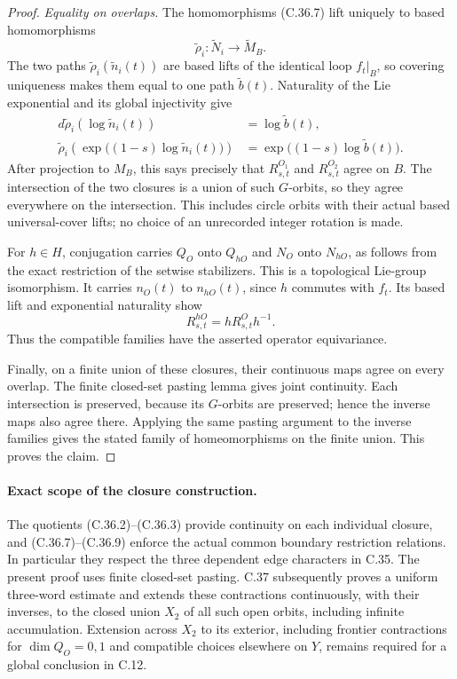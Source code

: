 \begin{proof}
\emph{Equality on overlaps.}
The homomorphisms (C.36.7) lift
uniquely to based homomorphisms
\[
               \widetilde\rho_i:
                    \widetilde N_i\longrightarrow
                    \widetilde M_B.
                                                        \tag{C.36.8}
\]
The two paths
$\widetilde\rho_i(\widetilde n_i(t))$
are based lifts of the identical
loop $f_t|_B$, so covering uniqueness
makes them equal to one path
$\widetilde b(t)$.
Naturality of the Lie exponential
and its global injectivity give
\[
 \begin{split}
 d\widetilde\rho_i(\log\widetilde n_i(t))
      &=\log\widetilde b(t),\\
 \widetilde\rho_i
   \!\left(\exp\bigl((1-s)\log\widetilde n_i(t)\bigr)\right)
      &=\exp\bigl((1-s)\log\widetilde b(t)\bigr).
 \end{split}                                             \tag{C.36.9}
\]
After projection to $M_B$, this says
precisely that $R^{O_1}_{s,t}$ and
$R^{O_2}_{s,t}$ agree on $B$.
The intersection of the two closures
is a union of such $G$-orbits, so
they agree everywhere on the
intersection. This includes circle
orbits with their actual based
universal-cover lifts; no choice
of an unrecorded integer rotation
is made.

For $h\in H$, conjugation carries
$Q_O$ onto $Q_{hO}$ and $N_O$
onto $N_{hO}$, as follows from
the exact restriction of the
setwise stabilizers. This is a
topological Lie-group isomorphism.
It carries $n_O(t)$ to
$n_{hO}(t)$, since $h$ commutes
with $f_t$. Its based lift and
exponential naturality show
\[
                    R^{hO}_{s,t}
                         =hR^O_{s,t}h^{-1}.
                                                        \tag{C.36.10}
\]
Thus the compatible families have
the asserted operator equivariance.

Finally, on a finite union of
these closures, their continuous
maps agree on every overlap.
The finite closed-set pasting
lemma gives joint continuity.
Each intersection is preserved,
because its $G$-orbits are
preserved; hence the inverse
maps also agree there.
Applying the same pasting
argument to the inverse families
gives the stated family of
homeomorphisms on the finite
union. This proves the claim.
\end{proof}

\paragraph{Exact scope of the closure construction.}
The quotients (C.36.2)--(C.36.3)
provide continuity on each
individual closure, and
(C.36.7)--(C.36.9) enforce the
actual common boundary restriction
relations. In particular they
respect the three dependent edge
characters in C.35.
The present proof uses finite
closed-set pasting. C.37
subsequently proves a uniform
three-word estimate and extends
these contractions continuously,
with their inverses, to the
closed union $X_2$ of all such
open orbits, including infinite
accumulation. Extension across
$X_2$ to its exterior, including
frontier contractions for
$\dim Q_O=0,1$ and compatible
choices elsewhere on $Y$,
remains required for a global
conclusion in C.12.
